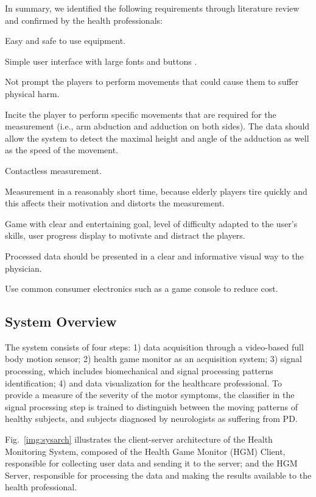 \documentclass[10pt, conference, compsocconf]{IEEEtran}
\begin{document}
In summary, we identified the following requirements through literature review and confirmed by the health professionals: 

\begin{compactenum}
    \item Easy and safe to use equipment.
    \item Simple user interface with large fonts and buttons \cite{Uzor:2014:ILU:2611247.2557160}.
    \item Not prompt the players to perform movements that could cause them to suffer physical harm.
    \item Incite the player to perform specific movements that are required for the measurement (i.e., arm abduction and adduction on both sides). The data should allow the system to detect the maximal height and angle of the adduction as well as the speed of the movement.
    \item Contactless measurement.
    \item Measurement in a reasonably short time, because elderly players tire quickly and this affects their motivation and distorts the measurement.
    \item Game with clear and entertaining goal, level of difficulty adapted to the user's skills, user progress display to motivate and distract the players\cite{Uzor:2014:ILU:2611247.2557160}.
    \item Processed data should be presented in a clear and informative visual way to the physician.
    \item Use common consumer electronics such as a game console to reduce cost.
\end{compactenum}

\subsection{System Overview}

 
The system consists of four steps: 1) data acquisition through a video-based full body motion sensor; 2) health game monitor as an acquisition system; 3) signal processing, which includes biomechanical and signal processing patterns identification; 4) and data visualization for the healthcare professional. To provide a measure of the severity of the motor symptoms, the classifier in the signal processing step is trained to distinguish between the moving patterns of healthy subjects, and subjects diagnosed by neurologists as suffering from PD.

Fig.~\ref{img:sysarch} illustrates the client-server architecture of the Health Monitoring System, composed of the Health Game Monitor (HGM) Client, responsible for collecting user data and sending it to the server; and the HGM Server, responsible for processing the data and making the results available to the health professional.
\end{document}
